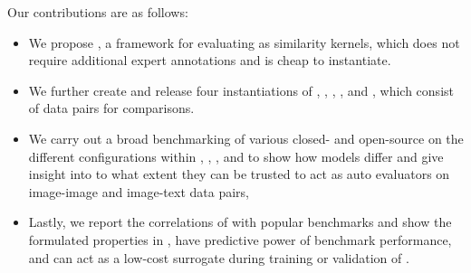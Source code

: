 

Our contributions are as follows:
\vspace{-4mm}
\begin{itemize}
    \item We propose \mmscore{}, a framework for evaluating \modelss{} as similarity kernels,  which does not require additional expert annotations and is cheap to instantiate.
    \item We further create and release four instantiations of \mmscore{}, \mmscorein, \mmscorecoco, \mmscorewuimgimg, and \mmscorewuimgtext, which consist of \mmscorecomparesize{} data pairs for comparisons.
    \item We carry out a broad benchmarking of various closed- and open-source \modelss{} on the different configurations within \mmscorein, \mmscorecoco, \mmscorewuimgimg, and \mmscorewuimgtext{} to show how models differ and give insight into to what extent they can be trusted to act as auto evaluators on image-image and image-text data pairs,
    \item Lastly, we report the correlations of \mmscore{} with popular benchmarks and show the formulated properties in \mmscore, have predictive power of benchmark performance, and can act as a low-cost surrogate during training or validation of \modelss{}.
\end{itemize}
